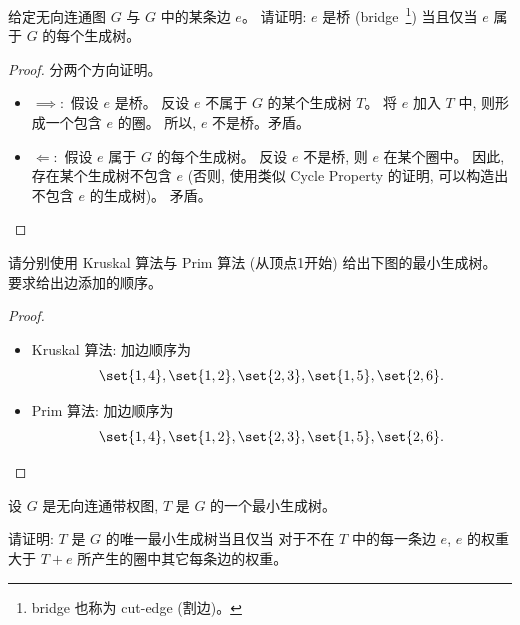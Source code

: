 \documentclass[a4paper, justified]{tufte-handout}
\begin{document}
\begin{problem}[生成树与桥]
  给定无向连通图 $G$ 与 $G$ 中的某条边 $e$。
  请证明: $e$ 是桥 (bridge~\footnote{bridge 也称为 cut-edge (割边)。})
    当且仅当 $e$ 属于 $G$ 的每个生成树。
\end{problem}

\begin{proof}
  分两个方向证明。
  \begin{itemize}
    \item $\implies:$ 假设 $e$ 是桥。
      反设 $e$ 不属于 $G$ 的某个生成树 $T$。
      将 $e$ 加入 $T$ 中, 则形成一个包含 $e$ 的圈。
      所以, $e$ 不是桥。矛盾。
    \item $\Longleftarrow:$ 假设 $e$ 属于 $G$ 的每个生成树。
      反设 $e$ 不是桥, 则 $e$ 在某个圈中。
      因此, 存在某个生成树不包含 $e$
      (否则, 使用类似 Cycle Property 的证明, 可以构造出不包含 $e$ 的生成树)。
      矛盾。
  \end{itemize}
\end{proof}

\begin{problem}[最小生成树算法]
  请分别使用 Kruskal 算法与 Prim 算法 (从顶点1开始)
  给出下图的最小生成树。
  要求给出边添加的顺序。

\end{problem}

\begin{proof}
  \begin{itemize}
    \item Kruskal 算法: 加边顺序为
      \[
        \set{1, 4}, \set{1, 2}, \set{2, 3}, \set{1, 5}, \set{2, 6}.
      \]
    \item Prim 算法: 加边顺序为
      \[
        \set{1, 4}, \set{1, 2}, \set{2, 3}, \set{1, 5}, \set{2, 6}.
      \]
  \end{itemize}
\end{proof}

\begin{problem}[唯一最小生成树]
  设 $G$ 是无向连通带权图, $T$ 是 $G$ 的一个最小生成树。

  \noindent 请证明: $T$ 是 $G$ 的唯一最小生成树当且仅当
  对于不在 $T$ 中的每一条边 $e$,
  $e$ 的权重大于 $T + e$ 所产生的圈中其它每条边的权重。
\end{problem}
\end{document}

